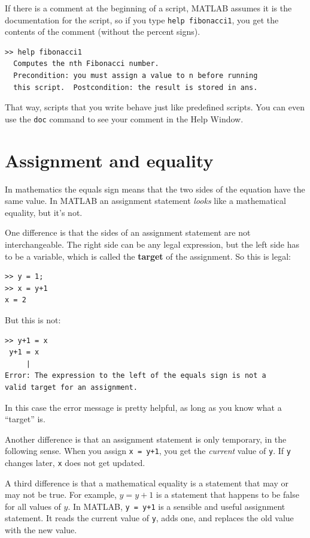\documentclass[
]{book}
\begin{document}
If there is a comment at the beginning of a script, MATLAB assumes
it is the documentation for the script, so if you type {\tt help
fibonacci1}, you get the contents of the comment (without the percent
signs).

\begin{verbatim}
>> help fibonacci1
  Computes the nth Fibonacci number.
  Precondition: you must assign a value to n before running
  this script.  Postcondition: the result is stored in ans.
\end{verbatim}

That way, scripts that you write behave just like predefined scripts.
You can even use the {\tt doc} command to see your comment in the
Help Window.

\section{Assignment and equality}

In mathematics the equals sign means that the two sides of the
equation have the same value.  In MATLAB an assignment statement
{\em looks} like a mathematical equality, but it's not.

One difference is that the sides of an assignment statement are not
interchangeable.  The right side can be any legal expression, but
the left side has to be a variable, which is called the {\bf
target} of the assignment.  So this is legal:

\begin{verbatim}
>> y = 1;
>> x = y+1
x = 2
\end{verbatim}

But this is not:

\begin{verbatim}
>> y+1 = x
 y+1 = x
     |
Error: The expression to the left of the equals sign is not a
valid target for an assignment.
\end{verbatim}

In this case the error message is pretty helpful, as long as you know
what a ``target'' is.

Another difference is that an assignment statement is only temporary,
in the following sense.  When you assign {\tt x = y+1}, you get the
{\em current} value of {\tt y}.  If {\tt y} changes later, {\tt x}
does not get updated.

A third difference is that a mathematical equality is a statement that
may or may not be true.  For example, $y = y+1$ is a statement that
happens to be false for all values of $y$.  In MATLAB, {\tt y
= y+1} is a sensible and useful assignment statement.  It reads the
current value of {\tt y}, adds one, and replaces the old value with
the new value.
\end{document}

